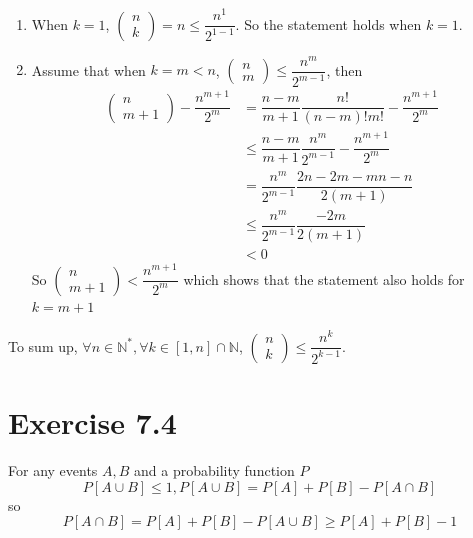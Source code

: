 \documentclass[a4paper,12pt,titlepage]{article}
\begin{document}
\begin{enumerate}
\item When $k=1$, $\begin{pmatrix}
n\\
k
\end{pmatrix}=n\leqslant\dfrac{n^1}{2^{1-1}}$. So the statement holds when $k=1$.

\item Assume that when $k=m<n$, $\begin{pmatrix}
n\\
m
\end{pmatrix}\leqslant\dfrac{n^m}{2^{m-1}}$, then
\begin{align*}
\begin{pmatrix}
n\\
m+1
\end{pmatrix}-\dfrac{n^{m+1}}{2^{m}}&=\dfrac{n-m}{m+1}\dfrac{n!}{(n-m)!m!}-\dfrac{n^{m+1}}{2^{m}}\\
&\leqslant\dfrac{n-m}{m+1}\dfrac{n^m}{2^{m-1}}-\dfrac{n^{m+1}}{2^{m}}\\
&=\dfrac{n^m}{2^{m-1}}\dfrac{2n-2m-mn-n}{2(m+1)}\\
&\leqslant\dfrac{n^m}{2^{m-1}}\dfrac{-2m}{2(m+1)}\\
&<0
\end{align*}
So $\begin{pmatrix}
n\\
m+1
\end{pmatrix}<\dfrac{n^{m+1}}{2^{m}}$ which shows that the statement also holds for $k=m+1$
\end{enumerate}

To sum up, $\forall n\in\mathbb{N}^*, \forall k\in[1,n]\cap\mathbb{N}$, $\begin{pmatrix}
n\\
k
\end{pmatrix}\leqslant\dfrac{n^k}{2^{k-1}}$.


\section*{Exercise 7.4}
For any events $A,B$ and a probability function $P$ 
$$P[A\cup B]\leqslant 1,P[A\cup B]=P[A]+P[B]-P[A\cap B]$$
so
$$P[A\cap B]=P[A]+P[B]-P[A\cup B]\geqslant P[A]+P[B]-1$$
\end{document}
